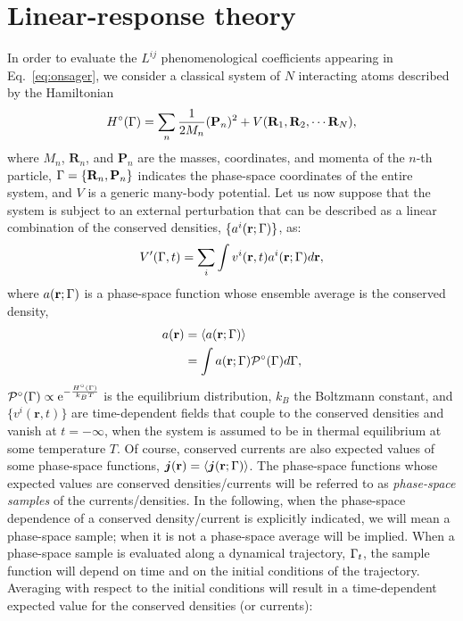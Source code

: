 \section{Linear-response theory}
In order to evaluate the $L^{ij}$ phenomenological coefficients appearing in Eq.~\eqref{eq:onsager}, we consider a classical system of $N$ interacting atoms described by the Hamiltonian
\begin{equation}
  H^\circ(\rGamma) = \sum_n\frac{1}{2M_n}(\mathbf{P}_n)^2 + V(\mathbf{R}_1,\mathbf{R}_2,\cdots \mathbf{R}_N), \label{eq:unperturbed_H}
\end{equation}
where $M_n$, $\mathbf{R}_n$, and $\mathbf{P}_n$ are the masses, coordinates, and momenta of the $n$-th particle, ${\mathrm\Gamma}=\{\mathbf{R}_n,\mathbf{P}_n\}$ indicates the phase-space coordinates of the entire system, and $V$ is a generic many-body potential. Let us now suppose that the system is subject to an external perturbation that can be described as a linear combination of the conserved densities, $\{a^i(\mathbf{r};{\mathrm\Gamma})\}$, as:
\begin{equation}
   V'(\rGamma,t) = \sum_i \int  v^i(\mathbf{r},t) a^i(\mathbf{r};\rGamma) d\mathbf{r}, \label{eq:perturbation}
\end{equation}
where $a(\mathbf{r};{\mathrm\Gamma})$ is a phase-space function whose ensemble average is the conserved density,
\begin{equation}
    \begin{aligned}
      a(\mathbf{r}) &= \langle a(\mathbf{r};{\mathrm\Gamma}) \rangle \\
      & = \int a(\mathbf{r};{\mathrm\Gamma}) \mathcal{P}^\circ({\mathrm\Gamma})d{\mathrm\Gamma},
    \end{aligned}
\end{equation}
$\mathcal{P}^\circ({\mathrm\Gamma}) \propto \mathrm{e}^{-\frac{H^\circ({\mathrm\Gamma})}{k_BT}}$ is the equilibrium distribution, $k_B$ the Boltzmann constant, and $\{v^i(\mathbf{r},t)\}$ are time-dependent fields that couple to the conserved densities and vanish at $t=-\infty$, when the system is assumed to be in thermal equilibrium at some temperature $T$. Of course, conserved currents are also expected values of some phase-space functions, $\bm{j}(\mathbf{r})=\langle \bm{j}(\mathbf{r};{\mathrm\Gamma})\rangle$. The phase-space functions whose expected values are conserved densities/currents will be referred to as \emph{phase-space samples} of the currents/densities. In the following, when the phase-space dependence of a conserved density/current is explicitly indicated, we will mean a phase-space sample; when it is not a phase-space average will be implied. When a phase-space sample is evaluated along a dynamical trajectory, ${\mathrm\Gamma}_t$, the sample function will depend on time and on the initial conditions of the trajectory. Averaging with respect to the initial conditions will result in a time-dependent expected value for the conserved densities (or currents):
